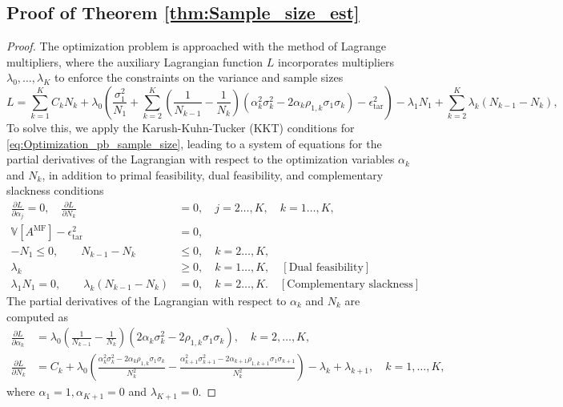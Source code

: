 \subsection{Proof of Theorem \ref{thm:Sample_size_est}}

\begin{proof}
The optimization problem is approached with the method of Lagrange multipliers, where the auxiliary Lagrangian function $L$ incorporates multipliers $\lambda_0,\ldots, \lambda_K$ to enforce the constraints on the variance and sample sizes
%
\[
L = \sum_{k=1}^K C_kN_k +\lambda_0 \left(\frac{\sigma_1^2}{N_1} + \sum_{k=2}^K \left(\frac{1}{N_{k-1}} - \frac{1}{N_k}\right)\left(\alpha_k^2\sigma_k^2 - 2\alpha_k\rho_{1,k}\sigma_1\sigma_k\right)- \epsilon_{\text{tar}}^2\right)-\lambda_1 N_1+\sum_{k=2}^K\lambda_k(N_{k-1} - N_k),
\]
%
To solve this, we apply the Karush-Kuhn-Tucker (KKT) conditions for \eqref{eq:Optimization_pb_sample_size}, leading to a system of equations for the partial derivatives of the Lagrangian with respect to the optimization variables $\alpha_k$ and $N_k$,  in addition to  primal feasibility, dual feasibility, and complementary slackness conditions
%
\begin{align*}
\frac{\partial L}{\partial \alpha_j}=0,\quad \frac{\partial L}{\partial N_k}&=0,\quad j=2\ldots,K, \quad k=1\ldots,K,\\
\mathbb{V}\left[A^{\text{MF}}\right]- \epsilon_{\text{tar}}^2 &= 0,\\
   -N_1\le 0,\qquad N_{k-1}-N_k&\le 0, \quad k=2\ldots,K,\\
    \lambda_k &\ge 0,\quad k=1\ldots,K, \quad [\text{Dual feasibility}]\\ 
    \lambda_1 N_1=0,\qquad\lambda_k(N_{k-1}-N_k)&=0,\quad k=2\ldots,K. \quad [\text{Complementary slackness}]
\end{align*}
%
The partial derivatives of the Lagrangian with respect to $\alpha_k$ and $N_k$ are computed as
%
\begin{align*}
    \frac{\partial L}{\partial \alpha_k}&=\lambda_0\left(\frac{1}{N_{k-1}} - \frac{1}{N_k}\right)\left(2\alpha_k\sigma_k^2 - 2\rho_{1,k}\sigma_1\sigma_k\right),\quad k=2,\dots,K,\\
    \frac{\partial L}{\partial N_k}&=C_k+\lambda_0\left(\frac{\alpha_k^2\sigma_k^2 - 2\alpha_k\rho_{1,k}\sigma_1\sigma_k}{N_k^2}-\frac{\alpha_{k+1}^2\sigma_{k+1}^2 - 2\alpha_{k+1}\rho_{1,k+1}\sigma_1\sigma_{k+1}}{N_k^2}\right)-\lambda_k+\lambda_{k+1}, \quad k=1,\dots,K,
\end{align*}
%
where $\alpha_1 = 1, \alpha_{K+1} = 0$ and $\lambda_{K+1} = 0$. 


\end{proof}
